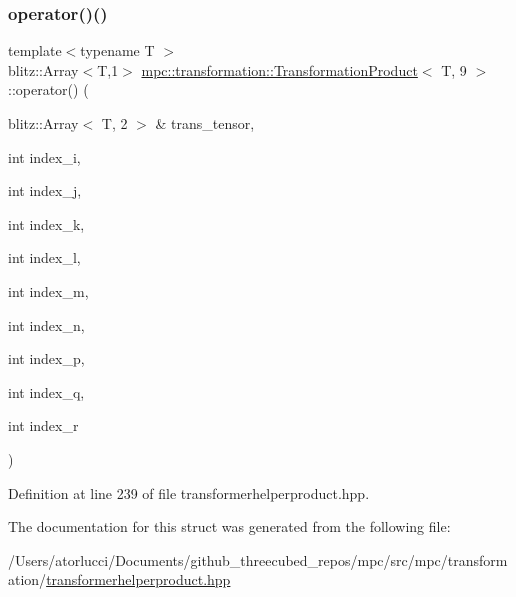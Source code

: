 \subsubsection{\texorpdfstring{operator()()}{operator()()}}
{\footnotesize\ttfamily template$<$typename T $>$ \\
blitz\+::\+Array$<$T,1$>$ \mbox{\hyperlink{structmpc_1_1transformation_1_1_transformation_product}{mpc\+::transformation\+::\+Transformation\+Product}}$<$ T, 9 $>$\+::operator() (\begin{DoxyParamCaption}\item[{blitz\+::\+Array$<$ T, 2 $>$ \&}]{trans\+\_\+tensor,  }\item[{int}]{index\+\_\+i,  }\item[{int}]{index\+\_\+j,  }\item[{int}]{index\+\_\+k,  }\item[{int}]{index\+\_\+l,  }\item[{int}]{index\+\_\+m,  }\item[{int}]{index\+\_\+n,  }\item[{int}]{index\+\_\+p,  }\item[{int}]{index\+\_\+q,  }\item[{int}]{index\+\_\+r }\end{DoxyParamCaption})\hspace{0.3cm}{\ttfamily [inline]}}



Definition at line 239 of file transformerhelperproduct.\+hpp.



The documentation for this struct was generated from the following file\+:\begin{DoxyCompactItemize}
\item 
/\+Users/atorlucci/\+Documents/github\+\_\+threecubed\+\_\+repos/mpc/src/mpc/transformation/\mbox{\hyperlink{transformerhelperproduct_8hpp}{transformerhelperproduct.\+hpp}}\end{DoxyCompactItemize}
